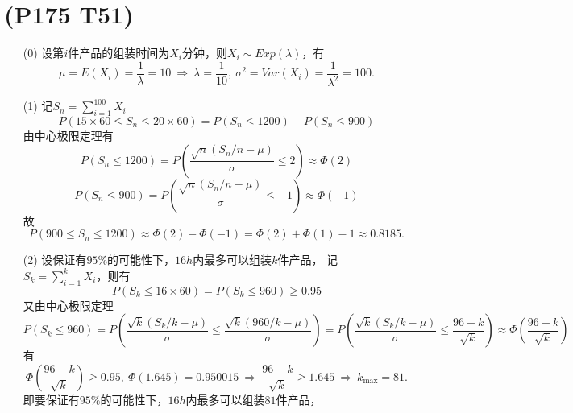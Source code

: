 \documentclass{article}
\begin{document}
\section{(P175 T51)}  %
\begin{enumerate}
    \item [(0)]设第$i$件产品的组装时间为$X_i$分钟，则$X_i \sim Exp(\lambda)$，有
    \[
        \mu = E(X_i) = \frac{1}{\lambda} = 10
        \ \Rightarrow\ 
        \lambda = \frac{1}{10},\ 
        \sigma^2 = Var(X_i) = \frac{1}{\lambda^2} = 100.    
    \]
    \item [(1)]记$S_n = \sum\limits_{i=1}^{100} X_i$
    \[
        P(15\times 60 \leq S_n \leq 20\times 60)  
        = P(S_n \leq 1200) - P(S_n \leq 900)  
    \]
    由中心极限定理有
    \[
        P(S_n \leq 1200)
        = P\left(\frac{\sqrt{n}(S_n / n - \mu)}{\sigma} \leq 2 \right)    
        \approx \Phi(2)
    \]
    \[
        P(S_n \leq 900)
        = P\left(\frac{\sqrt{n}(S_n / n - \mu)}{\sigma} \leq -1 \right)    
        \approx \Phi(-1)
    \]
    故
    \[
        P(900 \leq S_n \leq 1200)
        \approx \Phi(2) - \Phi(-1)
        = \Phi(2) + \Phi(1) - 1
        \approx 0.8185.
    \]
    \item [(2)]设保证有$95\% $的可能性下，$16h$内最多可以组装$k$件产品，
    记$S_k = \sum\limits_{i=1}^{k} X_i$，则有
    \[
        P\left( S_k \leq 16\times 60\right)
        = P\left( S_k \leq 960 \right)
        \geq 0.95
    \]
    又由中心极限定理
    \[
        P(S_k \leq 960)
        = P\left(\frac{\sqrt{k}(S_k / k - \mu)}{\sigma} \leq \frac{\sqrt{k}(960/ k - \mu)}{\sigma} \right)
        = P\left(\frac{\sqrt{k}(S_k / k - \mu)}{\sigma} \leq \frac{96 - k}{\sqrt{k}} \right)
        \approx \Phi\left( \frac{96 - k}{\sqrt{k}} \right)
    \]
    有
    \[
        \Phi\left( \frac{96 - k}{\sqrt{k}} \right) \geq 0.95,\ 
        \Phi(1.645)=0.950015
        \ \Rightarrow\ 
        \frac{96 - k}{\sqrt{k}} \geq 1.645
        \ \Rightarrow\ 
        k_{\max} = 81 .
    \]
    即要保证有$95\% $的可能性下，$16h$内最多可以组装$81$件产品，
\end{enumerate}

\clearpage
\end{document}
